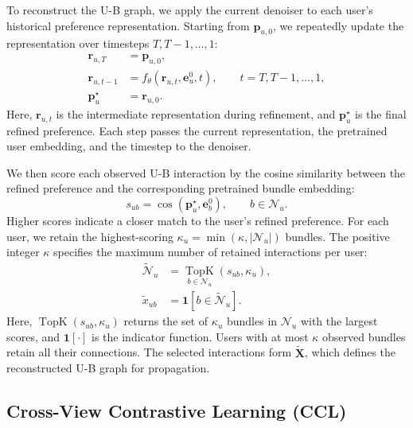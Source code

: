 \documentclass[letterpaper]{article}
\begin{document}
To reconstruct the U-B graph, we apply the current denoiser to each user's historical preference representation. Starting from $\mathbf p_{u,0}$, we repeatedly update the representation over timesteps $T,T-1,\ldots,1$:
\begin{equation}
\begin{aligned}
\mathbf r_{u,T}&=\mathbf p_{u,0},\\
\mathbf r_{u,t-1}
&=f_\theta(\mathbf r_{u,t},\mathbf e_u^0,t),
\qquad t=T,T-1,\ldots,1,\\
\mathbf p_u^\star&=\mathbf r_{u,0}.
\end{aligned}
\tag{9}
\end{equation}
Here, $\mathbf r_{u,t}$ is the intermediate representation during refinement, and $\mathbf p_u^\star$ is the final refined preference. Each step passes the current representation, the pretrained user embedding, and the timestep to the denoiser.

We then score each observed U-B interaction by the cosine similarity between the refined preference and the corresponding pretrained bundle embedding:
\begin{equation}
s_{ub}
=\cos(\mathbf p_u^\star,\mathbf e_b^0),
\qquad b\in\mathcal N_u.
\tag{10}
\end{equation}
Higher scores indicate a closer match to the user's refined preference. For each user, we retain the highest-scoring $\kappa_u=\min(\kappa,|\mathcal N_u|)$ bundles. The positive integer $\kappa$ specifies the maximum number of retained interactions per user:
\begin{equation}
\begin{aligned}
\widetilde{\mathcal N}_u
&=\underset{b\in\mathcal N_u}{\operatorname{TopK}}
\left(s_{ub},\kappa_u\right),\\
\widetilde x_{ub}
&=\mathbf 1\!\left[b\in\widetilde{\mathcal N}_u\right].
\end{aligned}
\tag{11}
\end{equation}
Here, $\operatorname{TopK}(s_{ub},\kappa_u)$ returns the set of $\kappa_u$ bundles in $\mathcal N_u$ with the largest scores, and $\mathbf 1[\cdot]$ is the indicator function. Users with at most $\kappa$ observed bundles retain all their connections. The selected interactions form $\widetilde{\mathbf X}$, which defines the reconstructed U-B graph for propagation.

\subsection{Cross-View Contrastive Learning (CCL)}
\end{document}
